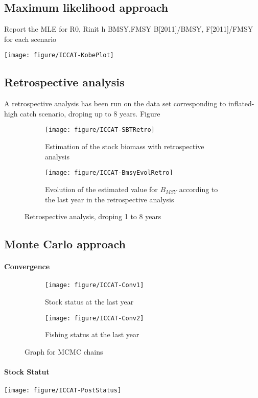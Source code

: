 
\subsection{Maximum likelihood approach}
Report the MLE for R0, Rinit h BMSY,FMSY B[2011]/BMSY, F[2011]/FMSY for each scenario
\begin{table}
 
\end{table}




{\centering \texttt{[image: figure/ICCAT-KobePlot]} 
}

\subsection{Retrospective analysis}
A retrospective analysis has been run on the data set corresponding to inflated-high  catch scenario, droping up to 8 years.
Figure 


\begin{figure}
\begin{subfigure}[b]{\textwidth}
\texttt{[image: figure/ICCAT-SBTRetro]}  
\caption{Estimation of the stock biomass with retrospective analysis}
\end{subfigure}
\begin{subfigure}[b]{\textwidth}
\texttt{[image: figure/ICCAT-BmsyEvolRetro]}  
\caption{Evolution of the estimated value for $B_{MSY}$ according to the last year in the retrospective analysis}
\end{subfigure}
\caption{Retrospective analysis, droping 1 to 8 years}
\end{figure}



\subsection{Monte Carlo approach}

\paragraph{Convergence}

\begin{figure}[htbp]
 \begin{subfigure}[b]{0.45\textwidth}
 \texttt{[image: figure/ICCAT-Conv1]}
  \caption{Stock status at the last year}
                \label{fig:mcmcstock}
  \end{subfigure}
 \begin{subfigure}[b]{0.45\textwidth} 
 \texttt{[image: figure/ICCAT-Conv2]}
\caption{Fishing status at the last year}
                \label{fig:mcmcfish}
  \end{subfigure}
  \caption{Graph for MCMC chains}
  \label{fig:mcmcdiag}
 \end{figure}

\paragraph{Stock Statut}
{\centering \texttt{[image: figure/ICCAT-PostStatus]} 
}

